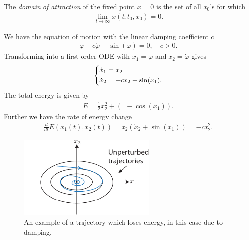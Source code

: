 \begin{definition} 
	The \emph{domain of attraction} of the fixed point $x=0$ is the set of all $ {x}_0$'s for which
	\begin{align}
		\boxed{\lim_{t\to \infty } {x}(t;t_0,  {x}_0)=0. }	
	\end{align}
	
\end{definition}

\begin{ex}
	We have the equation of motion with the linear damping coefficient $c$
	\begin{align}
		\ddot{\varphi} + c \dot{\varphi} + \sin(\varphi) = 0,\quad c>0.
	\end{align}
	Transforming into a first-order ODE with $x_1 = \varphi$ and $x_2 = \dot{\varphi}$ gives
	 \begin{align}
		\begin{dcases}
		\dot{x}_1 = x_2\\ \dot{x}_2 = -cx_2 - \sin(x_1).
		\end{dcases}
	\end{align}
The total energy is given by
\begin{align}
	E = \frac{1}{2}x_2^2 + \left( 1 - \cos(x_1) \right). 
\end{align}
Further we have the rate of energy change
\begin{align}
\frac{d}{dt} E(x_1(t), x_2(t)) = x_2 \left(\dot{x}_2 + \sin(x_1) \right) = -c x_2^{2}.
\end{align}
\begin{figure}[h!]
	\centering
	\includegraphics[width=0.6\textwidth]{figures/ch2/4damped_pendulum.pdf}
	\caption{An example of a trajectory which loses energy, in this case due to damping.}
	\label{fig:losing_energy_pend}
\end{figure}


\end{ex}
